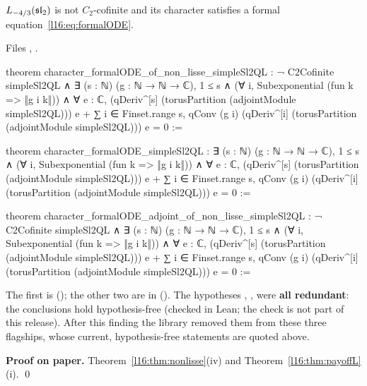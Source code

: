 \begin{theorem}\label{l16:thm:nonlissePayoff}
$L_{-4/3}(\mathfrak{sl}_2)$ is not $C_2$-cofinite and its character satisfies a formal equation~\eqref{l16:eq:formalODE}.
\end{theorem}
\noindent Files ,
.
\begin{leancode}
theorem character_formalODE_of_non_lisse_simpleSl2QL :
    ¬ C2Cofinite simpleSl2QL ∧
      ∃ (s : ℕ) (g : ℕ → ℕ → ℂ), 1 ≤ s ∧ (∀ i, Subexponential (fun k => ‖g i k‖)) ∧
        ∀ e : ℂ, (qDeriv^[s] (torusPartition (adjointModule simpleSl2QL))) e
          + ∑ i ∈ Finset.range s,
              qConv (g i) (qDeriv^[i] (torusPartition (adjointModule simpleSl2QL))) e = 0 :=

theorem character_formalODE_simpleSl2QL :
    ∃ (s : ℕ) (g : ℕ → ℕ → ℂ), 1 ≤ s ∧ (∀ i, Subexponential (fun k => ‖g i k‖)) ∧
      ∀ e : ℂ, (qDeriv^[s] (torusPartition (adjointModule simpleSl2QL))) e
        + ∑ i ∈ Finset.range s,
            qConv (g i) (qDeriv^[i] (torusPartition (adjointModule simpleSl2QL))) e = 0 :=

theorem character_formalODE_adjoint_of_non_lisse_simpleSl2QL :
    ¬ C2Cofinite simpleSl2QL ∧
      ∃ (s : ℕ) (g : ℕ → ℕ → ℂ), 1 ≤ s ∧ (∀ i, Subexponential (fun k => ‖g i k‖)) ∧
        ∀ e : ℂ, (qDeriv^[s] (torusPartition (adjointModule simpleSl2QL))) e
          + ∑ i ∈ Finset.range s,
              qConv (g i) (qDeriv^[i] (torusPartition (adjointModule simpleSl2QL))) e = 0 :=
\end{leancode}

\begin{dictionary}
The first is \allowbreak{}\allowbreak{}\allowbreak{}\allowbreak{}\allowbreak{} (); the other two are
in \allowbreak{} (). The hypotheses , ,
 were \textbf{all redundant}: the conclusions hold hypothesis-free (checked in Lean; the check is not part of this release). After this
finding the library removed them from these three flagships, whose current, hypothesis-free statements are quoted above.
\end{dictionary}

\textbf{Proof on paper.} Theorem~\ref{l16:thm:nonlisse}(iv) and Theorem~\ref{l16:thm:payoffL}(i). \qed

